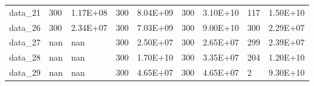 \begin{table}[!h]
\begin{tabular}{lllllllll}
data\_21 & 300                 & 1.17E+08                & 300                   & 8.04E+09                 & 300                & 3.10E+10               & 117                  & 1.50E+10                \\
data\_26 & 300                 & 2.34E+07                & 300                   & 7.03E+09                 & 300                & 9.00E+10               & 300                  & 2.29E+07                \\
data\_27 & nan                 & nan                     & 300                   & 2.50E+07                 & 300                & 2.65E+07               & 299                  & 2.39E+07                \\
data\_28 & nan                 & nan                     & 300                   & 1.70E+10                 & 300                & 3.35E+07               & 204                  & 1.20E+10                \\
data\_29 & nan                 & nan                     & 300                   & 4.65E+07                 & 300                & 4.65E+07               & 2                    & 9.30E+10                \\ \hline
\end{tabular}
\end{table}